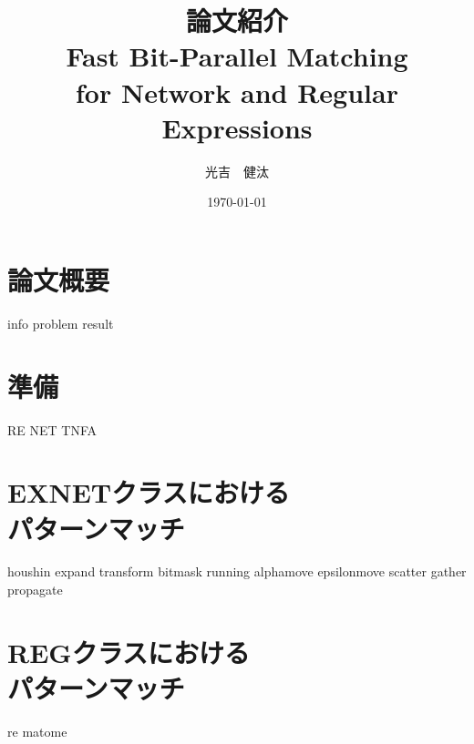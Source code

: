 \documentclass[dvipdfmx,12pt,notheorems]{beamer} %
\title[略タイトル]{論文紹介\\ {\normalsize Fast Bit-Parallel Matching \\for Network and Regular Expressions}} %
\author[Mitsuyoshi]{光吉　健汰\inst{1}}
\institute[IKN]{\inst{1}北海道大学工学部 情報エレクトロニクス学科 情報理工学コース 4年\\
情報知識ネットワーク研究室}
\date{\today}%
\begin{document}
\begin{frame}
	\frametitle{}
	\titlepage
\end{frame}


\section{論文概要}
{info}
{problem}
{result}

\section{準備}
{RE}
{NET}
{TNFA}

\section{\textsf{EXNET}クラスにおける\\パターンマッチ}
{houshin}
{expand}
{transform}
{bitmask}
{running}
{alphamove}
{epsilonmove}
{scatter}
{gather}
{propagate}

\section{\textsf{REG}クラスにおける\\パターンマッチ}
{re}
{matome}


	
\end{document}
